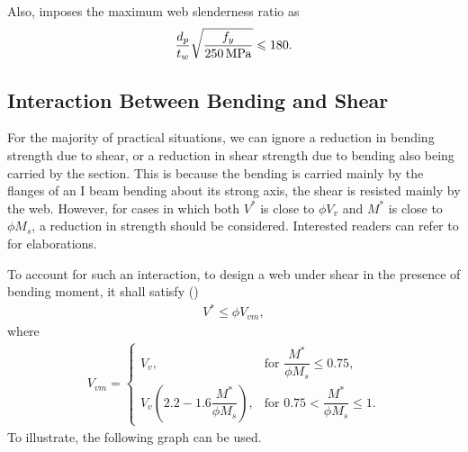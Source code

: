 Also,  imposes the maximum web slenderness ratio as
\begin{gather}
\dfrac{d_p}{t_w}\sqrt{\dfrac{f_y}{\SI{250}{\mega\pascal}}}\leqslant180.
\end{gather}
\begin{figure}[H]
\centering
\end{figure}
\subsection{Interaction Between Bending and Shear}
For the majority of practical situations, we can ignore a reduction in bending strength due to shear, or a reduction in shear strength due to bending also being carried by the section. This is because the bending is carried mainly by the flanges of an I beam bending about its strong axis, the shear is resisted mainly by the web.
However, for cases in which both $V^*$ is close to $\phi{}V_v$ and $M^*$ is close to $\phi{}M_s$, a reduction in strength should be considered. Interested readers can refer to \citet{JCWRCA1971} for elaborations.

To account for such an interaction, to design a web under shear in the presence of bending moment, it shall satisfy ()
\begin{gather}
V^*\leqslant\phi{}V_{vm},
\end{gather}
where
\begin{gather}
V_{vm}=\left\{
\begin{array}{ll}
V_v,&\text{for~}\dfrac{M^*}{\phi{}M_s}\leqslant0.75,\\
V_v\left(2.2-1.6\dfrac{M^*}{\phi{}M_s}\right),&\text{for~}0.75<\dfrac{M^*}{\phi{}M_s}\leqslant1.
\end{array}
\right.
\end{gather}
To illustrate, the following graph can be used.
\begin{figure}[H]
\centering
\end{figure}

